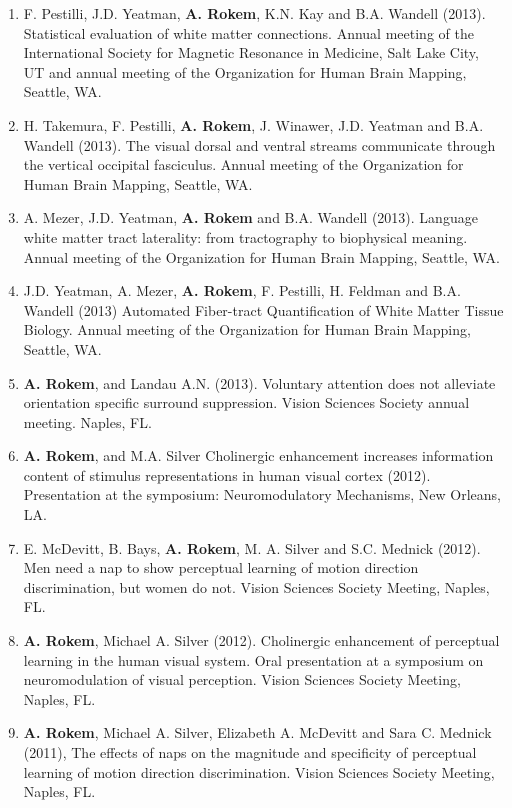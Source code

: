 \documentclass[11pt,fullpage]{article}
\begin{document}
\begin{enumerate}
\item F. Pestilli, J.D. Yeatman, {\bf A. Rokem}, K.N. Kay and B.A. Wandell (2013). Statistical evaluation of white matter connections. Annual meeting of the International Society for Magnetic Resonance in Medicine, Salt Lake City, UT and annual meeting of the Organization for Human Brain Mapping, Seattle, WA.

\item H. Takemura, F. Pestilli, {\bf A. Rokem}, J. Winawer, J.D. Yeatman and B.A. Wandell (2013). The visual dorsal and ventral streams communicate through the vertical occipital fasciculus. Annual meeting of the Organization for Human Brain Mapping, Seattle, WA.

\item A. Mezer, J.D. Yeatman, {\bf A. Rokem} and B.A. Wandell (2013). Language white matter tract laterality: from tractography to biophysical meaning. Annual meeting of the Organization for Human Brain Mapping, Seattle, WA.

\item J.D. Yeatman, A. Mezer, {\bf A. Rokem}, F. Pestilli, H. Feldman and B.A. Wandell (2013) Automated Fiber-tract Quantification of White Matter Tissue Biology. Annual meeting of the Organization for Human Brain Mapping, Seattle, WA.

\item {\bf A. Rokem}, and Landau A.N. (2013). Voluntary attention does not alleviate orientation specific surround suppression. Vision Sciences Society annual meeting. Naples, FL.

\item {\bf A. Rokem}, and M.A. Silver Cholinergic enhancement increases information content of stimulus representations in human visual cortex (2012). Presentation at the symposium: Neuromodulatory Mechanisms, New Orleans, LA.

\item E. McDevitt, B. Bays, {\bf A. Rokem}, M. A. Silver and S.C. Mednick (2012). Men need a nap to show perceptual learning of motion direction discrimination, but women do not. Vision Sciences Society Meeting, Naples, FL.

\item {\bf A. Rokem}, Michael A. Silver (2012). Cholinergic enhancement of perceptual learning in the human visual system. Oral presentation at a symposium on neuromodulation of visual perception. Vision Sciences Society Meeting, Naples, FL.

\item {\bf A. Rokem}, Michael A. Silver, Elizabeth A. McDevitt and Sara C. Mednick (2011), The effects of naps on the magnitude and specificity of perceptual learning of motion direction discrimination. Vision Sciences Society Meeting, Naples, FL.


\end{enumerate}
\end{document}
